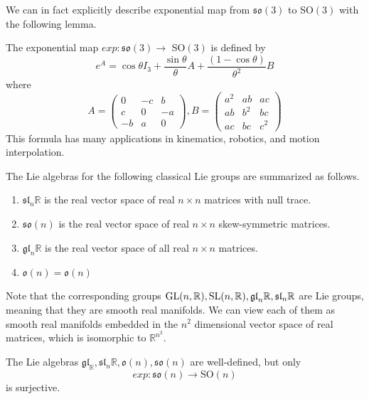   We can in fact explicitly describe exponential map from $\mathfrak{so}(3)$ to SO$(3)$ with the following lemma. 

  \begin{lemma}
    The exponential map $exp: \mathfrak{so}(3) \rightarrow$ SO$(3)$ is defined by 
    \begin{equation}
      e^A = \cos{\theta} I_3 + \frac{\sin{\theta}}{\theta} A + \frac{(1 - \cos{\theta})}{\theta^2} B
    \end{equation}
    where 
    \begin{equation}
      A = \begin{pmatrix}
      0&-c&b\\c&0&-a\\-b&a&0
      \end{pmatrix}, B = \begin{pmatrix}
      a^2&ab&ac\\ab&b^2&bc\\ac&bc&c^2
      \end{pmatrix}
    \end{equation}
    This formula has many applications in kinematics, robotics, and motion interpolation. 
  \end{lemma}

  \begin{theorem}
  The Lie algebras for the following classical Lie groups are summarized as follows. 
  \begin{enumerate}
    \item $\mathfrak{sl}_n \mathbb{R}$ is the real vector space of real $n \times n$ matrices with null trace.
    \item $\mathfrak{so}(n)$ is the real vector space of real $n \times n$ skew-symmetric matrices. 
    \item $\mathfrak{gl}_n \mathbb{R}$ is the real vector space of all real $n \times n$ matrices.
    \item $\mathfrak{o}(n) = \mathfrak{o}(n)$
  \end{enumerate}
  \end{theorem}
  Note that the corresponding groups $\operatorname{GL}(n, \mathbb{R}), \operatorname{SL}(n, \mathbb{R}), \mathfrak{gl}_n \mathbb{R}, \mathfrak{sl}_n \mathbb{R}$ are Lie groups, meaning that they are smooth real manifolds. We can view each of them as smooth real manifolds embedded in the $n^2$ dimensional vector space of real matrices, which is isomorphic to $\mathbb{R}^{n^2}$. 

  \begin{theorem}
    The Lie algebras $\mathfrak{gl}_ \mathbb{R}, \mathfrak{sl}_n \mathbb{R}, \mathfrak{o}(n), \mathfrak{so}(n)$ are well-defined, but only 
    \begin{equation}
      exp: \mathfrak{so}(n) \rightarrow \text{SO}(n)
    \end{equation}
    is surjective. 
  \end{theorem}

